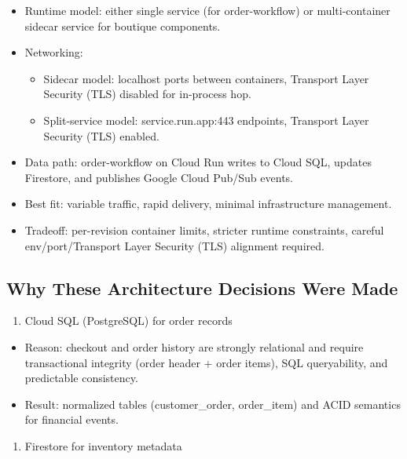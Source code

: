 \documentclass[
]{article}
\providecommand{\tightlist}{%
  \setlength{\itemsep}{0pt}\setlength{\parskip}{0pt}}
\begin{document}
\begin{itemize}
\tightlist
\item
  Runtime model: either single service (for order-workflow) or
  multi-container sidecar service for boutique components.
\item
  Networking:

  \begin{itemize}
  \tightlist
  \item
    Sidecar model: localhost ports between containers, Transport Layer
    Security (TLS) disabled for in-process hop.
  \item
    Split-service model: service.run.app:443 endpoints, Transport Layer
    Security (TLS) enabled.
  \end{itemize}
\item
  Data path: order-workflow on Cloud Run writes to Cloud SQL, updates
  Firestore, and publishes Google Cloud Pub/Sub events.
\item
  Best fit: variable traffic, rapid delivery, minimal infrastructure
  management.
\item
  Tradeoff: per-revision container limits, stricter runtime constraints,
  careful env/port/Transport Layer Security (TLS) alignment required.
\end{itemize}

\subsection{Why These Architecture Decisions Were
Made}\label{why-these-architecture-decisions-were-made}

\begin{enumerate}
\def\labelenumi{\arabic{enumi}.}
\tightlist
\item
  Cloud SQL (PostgreSQL) for order records
\end{enumerate}

\begin{itemize}
\tightlist
\item
  Reason: checkout and order history are strongly relational and require
  transactional integrity (order header + order items), SQL
  queryability, and predictable consistency.
\item
  Result: normalized tables (customer\_order, order\_item) and ACID
  semantics for financial events.
\end{itemize}

\begin{enumerate}
\def\labelenumi{\arabic{enumi}.}
\setcounter{enumi}{1}
\tightlist
\item
  Firestore for inventory metadata
\end{enumerate}
\end{document}
